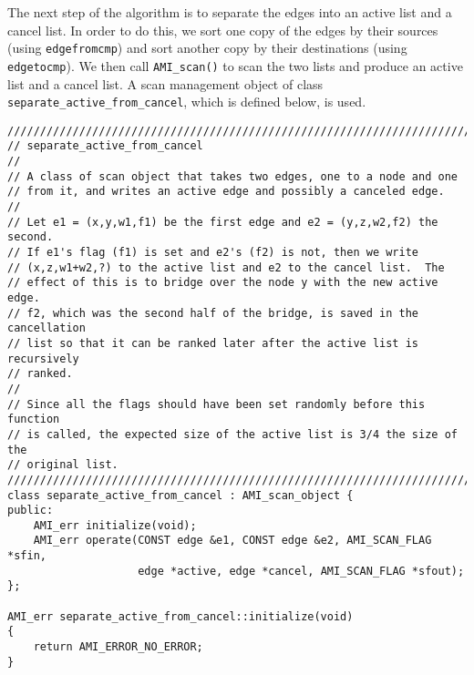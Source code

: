 The next step of the algorithm is to separate the edges into an active
list and a cancel list.  In order to do this, we sort one copy of the
edges by their sources (using \verb|edgefromcmp|) and sort another copy by
their destinations (using \verb|edgetocmp|).  We then call
\verb|AMI_scan()| to scan the two lists and produce an active list and
a cancel list.  A scan management object of class
\verb|separate_active_from_cancel|, which is defined below, is used.

\begin{verbatim}
////////////////////////////////////////////////////////////////////////
// separate_active_from_cancel
//
// A class of scan object that takes two edges, one to a node and one 
// from it, and writes an active edge and possibly a canceled edge.
//
// Let e1 = (x,y,w1,f1) be the first edge and e2 = (y,z,w2,f2) the second.
// If e1's flag (f1) is set and e2's (f2) is not, then we write 
// (x,z,w1+w2,?) to the active list and e2 to the cancel list.  The
// effect of this is to bridge over the node y with the new active edge.
// f2, which was the second half of the bridge, is saved in the cancellation
// list so that it can be ranked later after the active list is recursively 
// ranked.
//
// Since all the flags should have been set randomly before this function
// is called, the expected size of the active list is 3/4 the size of the
// original list.
////////////////////////////////////////////////////////////////////////
class separate_active_from_cancel : AMI_scan_object {
public:
    AMI_err initialize(void);
    AMI_err operate(CONST edge &e1, CONST edge &e2, AMI_SCAN_FLAG *sfin,
                    edge *active, edge *cancel, AMI_SCAN_FLAG *sfout);
};

AMI_err separate_active_from_cancel::initialize(void)
{
    return AMI_ERROR_NO_ERROR;
}


\end{verbatim}
